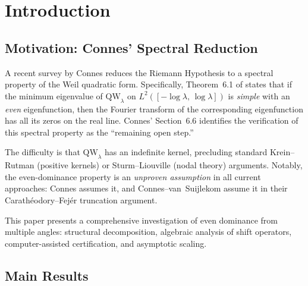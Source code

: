 \documentclass[12pt,a4paper]{article}
\theoremstyle{definition}
\theoremstyle{remark}
\begin{document}
\tableofcontents


\section{Introduction}
\label{sec:intro}

\subsection{Motivation: Connes' Spectral Reduction}

A recent survey by Connes \cite{Connes2025} reduces the Riemann Hypothesis to a spectral property of the Weil quadratic form. Specifically, Theorem~6.1 of \cite{Connes2025} states that if the minimum eigenvalue of $\mathrm{QW}_\lambda$ on $L^2([-\log\lambda,\,\log\lambda])$ is \emph{simple} with an \emph{even} eigenfunction, then the Fourier transform of the corresponding eigenfunction has all its zeros on the real line. Connes' Section~6.6 identifies the verification of this spectral property as the ``remaining open step.''

The difficulty is that $\mathrm{QW}_\lambda$ has an indefinite kernel, precluding standard Krein--Rutman (positive kernels) or Sturm--Liouville (nodal theory) arguments. Notably, the even-dominance property is an \emph{unproven assumption} in all current approaches: Connes \cite{Connes2025} assumes it, and Connes--van~Suijlekom \cite{ConnesvS2025} assume it in their Carath\'eodory--Fej\'er truncation argument.

This paper presents a comprehensive investigation of even dominance from multiple angles: structural decomposition, algebraic analysis of shift operators, computer-assisted certification, and asymptotic scaling.

\subsection{Main Results}
\end{document}

